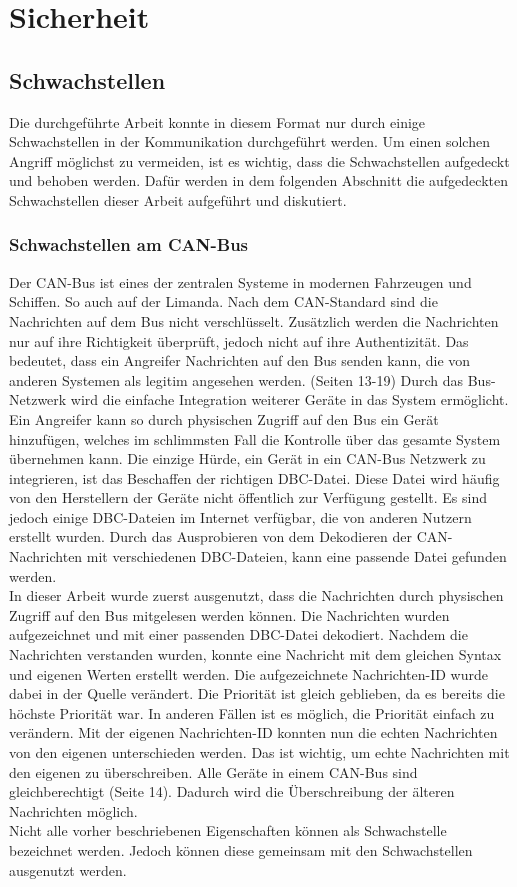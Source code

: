 \chapter{Sicherheit}

\section{Schwachstellen}
Die durchgeführte Arbeit konnte in diesem Format nur durch einige Schwachstellen in der Kommunikation durchgeführt werden.
Um einen solchen Angriff möglichst zu vermeiden, ist es wichtig, dass die Schwachstellen aufgedeckt und behoben werden.
Dafür werden in dem folgenden Abschnitt die aufgedeckten Schwachstellen dieser Arbeit aufgeführt und diskutiert.

\subsection{Schwachstellen am CAN-Bus}
Der CAN-Bus ist eines der zentralen Systeme in modernen Fahrzeugen und Schiffen. So auch auf der Limanda.
Nach dem CAN-Standard sind die Nachrichten auf dem Bus nicht verschlüsselt. Zusätzlich werden die Nachrichten nur 
auf ihre Richtigkeit überprüft, jedoch nicht auf ihre Authentizität. Das bedeutet, dass ein Angreifer Nachrichten auf den Bus
senden kann, die von anderen Systemen als legitim angesehen werden.\cite{Voss2008} (Seiten 13-19) Durch das Bus-Netzwerk wird die einfache Integration
weiterer
Geräte in das System ermöglicht. Ein Angreifer kann so durch physischen Zugriff auf den Bus ein Gerät hinzufügen, welches im schlimmsten Fall
die Kontrolle über das gesamte System übernehmen kann. Die einzige Hürde, ein Gerät in ein CAN-Bus Netzwerk zu integrieren, ist das
Beschaffen der richtigen DBC-Datei. Diese Datei wird häufig von den Herstellern der Geräte nicht öffentlich zur Verfügung gestellt.
Es sind jedoch einige DBC-Dateien im Internet verfügbar, die von anderen Nutzern erstellt wurden. Durch das Ausprobieren von dem Dekodieren
der CAN-Nachrichten mit verschiedenen DBC-Dateien, kann eine passende Datei gefunden werden. \\
In dieser Arbeit wurde zuerst ausgenutzt, dass die Nachrichten durch physischen Zugriff auf den Bus mitgelesen werden können.
Die Nachrichten wurden aufgezeichnet und mit einer passenden DBC-Datei dekodiert. Nachdem die Nachrichten verstanden wurden, konnte
eine Nachricht mit dem gleichen Syntax und eigenen Werten erstellt werden. Die aufgezeichnete Nachrichten-ID wurde dabei in der Quelle 
verändert. Die Priorität ist gleich geblieben, da es bereits die höchste Priorität war. In anderen Fällen ist es möglich, die Priorität
einfach zu verändern. Mit der eigenen Nachrichten-ID konnten nun die 
echten Nachrichten von den eigenen unterschieden werden. Das ist wichtig, um echte Nachrichten mit den eigenen zu überschreiben. 
Alle Geräte in einem CAN-Bus sind gleichberechtigt\cite{Voss2008} (Seite 14). Dadurch wird die Überschreibung der älteren Nachrichten möglich.\\
Nicht alle vorher beschriebenen Eigenschaften können als Schwachstelle bezeichnet werden. Jedoch können diese gemeinsam mit den
Schwachstellen ausgenutzt werden. \\

